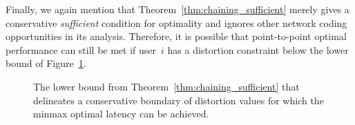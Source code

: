 Finally, we again mention that Theorem~\ref{thm:chaining_sufficient} merely gives a conservative \emph{sufficient} condition for optimality and ignores other network coding opportunities in its analysis.  Therefore, it is possible that point-to-point optimal performance can still be met if user~$i$ has a distortion constraint below the lower bound of Figure~\ref{fig:operational_meaning}.

\begin{figure}
	\centering
	\setlength\figurewidth{2.65in} 
	\setlength\figureheight{2.07in} 
	
	\caption{The lower bound from Theorem~\ref{thm:chaining_sufficient} that delineates a conservative boundary of distortion values for which the minmax optimal latency can be achieved.  }
	\label{fig:operational_meaning}
\end{figure}
